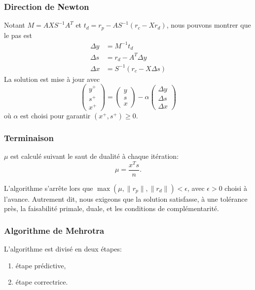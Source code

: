 \documentclass[usepdftitle=false, aspectratio=169]{beamer}
\begin{document}
\begin{frame}
\frametitle{Direction de Newton}

Notant $M = AXS^{-1}A^T$ et $t_d = r_p-AS^{-1}(r_c-Xr_d)$, nous pouvons montrer que le pas est
\begin{align*}
\Delta y &= M^{-1}t_d \\
\Delta s &= r_d - A^{T}\Delta y \\
\Delta x &= S^{-1}(r_c-X \Delta s)
\end{align*}
La solution est mise à jour avec
$$
\begin{pmatrix}
y^+ \\
s^+ \\
x^+
\end{pmatrix}
=
\begin{pmatrix}
	y \\
	s \\
	x
\end{pmatrix}
-
\alpha
\begin{pmatrix}
	\Delta y \\
	\Delta s \\
	\Delta x
\end{pmatrix}
$$
où $\alpha$ est choisi pour garantir $(x^+, s^+) \geq 0$.

\end{frame}

\begin{frame}
\frametitle{Terminaison}

$\mu$ est calculé suivant le saut de dualité à chaque itération:
$$
\mu = \frac{x^Ts}{n}.
$$

\mbox{}

L'algorithme s'arrête lors que $\max(\mu, \|r_p\|, \|r_d\|) < \epsilon$, avec $\epsilon > 0$ choisi à l'avance. Autrement dit, nous exigeons que la solution satisfasse, à une tolérance près, la faisabilité primale, duale, et les conditions de complémentarité.

\end{frame}

\begin{frame}
\frametitle{Algorithme de Mehrotra}

L'algorithme est divisé en deux étapes:
\begin{enumerate}
\item
étape prédictive,
\item
étape correctrice.
\end{enumerate}

\end{frame}
\end{document}
